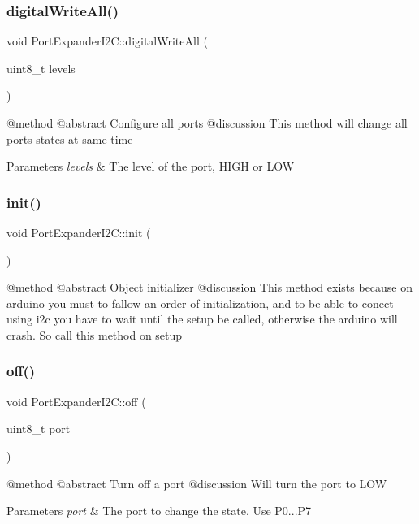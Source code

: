 \subsubsection{\texorpdfstring{digitalWriteAll()}{digitalWriteAll()}}
{\footnotesize\ttfamily void Port\+Expander\+I2\+C\+::digital\+Write\+All (\begin{DoxyParamCaption}\item[{uint8\+\_\+t}]{levels }\end{DoxyParamCaption})}

@method @abstract Configure all ports @discussion This method will change all ports states at same time 
\begin{DoxyParams}{Parameters}
{\em levels} & The level of the port, H\+I\+GH or L\+OW \\
\hline
\end{DoxyParams}
\mbox{\label{classPortExpanderI2C_ac997f79ae241b47627bd6f74a006c1d4}} 
\subsubsection{\texorpdfstring{init()}{init()}}
{\footnotesize\ttfamily void Port\+Expander\+I2\+C\+::init (\begin{DoxyParamCaption}{ }\end{DoxyParamCaption})}

@method @abstract Object initializer @discussion This method exists because on arduino you must to fallow an order of initialization, and to be able to conect using i2c you have to wait until the setup be called, otherwise the arduino will crash. So call this method on setup \mbox{\label{classPortExpanderI2C_af037e0a92ca4f4ff8a8aca6d9cb70bba}} 
\subsubsection{\texorpdfstring{off()}{off()}}
{\footnotesize\ttfamily void Port\+Expander\+I2\+C\+::off (\begin{DoxyParamCaption}\item[{uint8\+\_\+t}]{port }\end{DoxyParamCaption})}

@method @abstract Turn off a port @discussion Will turn the port to L\+OW 
\begin{DoxyParams}{Parameters}
{\em port} & The port to change the state. Use P0...P7 \\
\hline
\end{DoxyParams}
\mbox{\label{classPortExpanderI2C_a3fb6d4218f75570a71f9b07ebd58a718}} 
